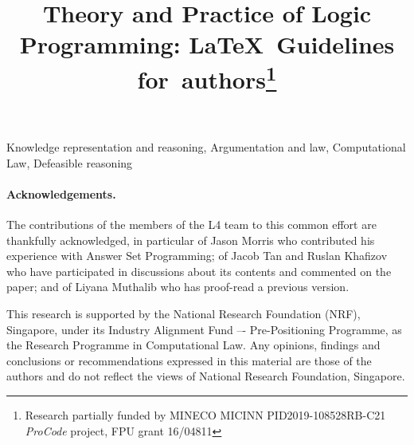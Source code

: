\documentclass{tlp}
\begin{document}


\title[Theory and Practice of Logic Programming]{Theory and Practice of Logic Programming: \LaTeX\ Guidelines for~authors\thanks{Research partially funded by
      MINECO
      MICINN PID2019-108528RB-C21 \emph{ProCode} project, FPU grant
      16/04811}}

\begin{authgrp}
\author{ }
\author{ }
\end{authgrp}


\maketitle

\begin{abstract}

\end{abstract}

\begin{keywords}
  Knowledge representation and reasoning,
  Argumentation and law,
  Computational Law,
  Defeasible reasoning
\end{keywords}















\paragraph{Acknowledgements.}
The contributions of the members of the L4 team to this common effort are
thankfully acknowledged, in particular of Jason Morris who contributed his
experience with Answer Set Programming; of Jacob Tan and Ruslan Khafizov who
have participated in discussions about its contents and commented on the
paper; and of Liyana Muthalib who has proof-read a previous version.

This research is supported by the National Research Foundation (NRF),
Singapore, under its Industry Alignment Fund –- Pre-Positioning Programme, as
the Research Programme in Computational Law. Any opinions, findings and
conclusions or recommendations expressed in this material are those of the
authors and do not reflect the views of National Research Foundation,
Singapore.


\newpage
\appendix




\end{document}
